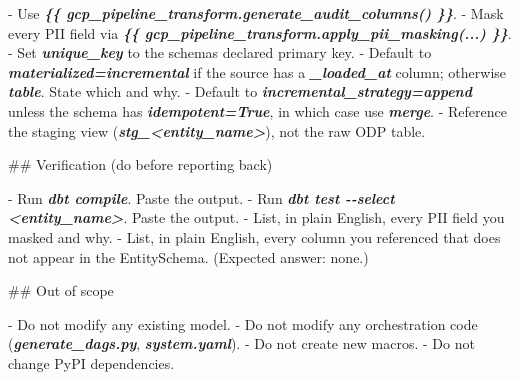 \documentclass[
  11pt,
  british,
  oneside]{book}
\newenvironment{Shaded}{\begin{snugshade}}{\end{snugshade}}
\newcommand{\FunctionTok}[1]{\textcolor[rgb]{0.00,0.00,0.00}{#1}}
\newcommand{\InformationTok}[1]{\textcolor[rgb]{0.56,0.35,0.01}{\textbf{\textit{#1}}}}
\newcommand{\NormalTok}[1]{#1}
\newcommand{\SpecialStringTok}[1]{\textcolor[rgb]{0.31,0.60,0.02}{#1}}
\begin{document}
\begin{Shaded}
\begin{Highlighting}[]
\SpecialStringTok{{-} }\NormalTok{Use }\InformationTok{\textasciigrave{}\{\{ gcp\_pipeline\_transform.generate\_audit\_columns() \}\}\textasciigrave{}}\NormalTok{.}
\SpecialStringTok{{-} }\NormalTok{Mask every PII field via}
  \InformationTok{\textasciigrave{}\{\{ gcp\_pipeline\_transform.apply\_pii\_masking(...) \}\}\textasciigrave{}}\NormalTok{.}
\SpecialStringTok{{-} }\NormalTok{Set }\InformationTok{\textasciigrave{}unique\_key\textasciigrave{}}\NormalTok{ to the schema\textquotesingle{}s declared primary key.}
\SpecialStringTok{{-} }\NormalTok{Default to }\InformationTok{\textasciigrave{}materialized=\textquotesingle{}incremental\textquotesingle{}\textasciigrave{}}\NormalTok{ if the source has a}
  \InformationTok{\textasciigrave{}\_loaded\_at\textasciigrave{}}\NormalTok{ column; otherwise }\InformationTok{\textasciigrave{}table\textasciigrave{}}\NormalTok{. State which and why.}
\SpecialStringTok{{-} }\NormalTok{Default to }\InformationTok{\textasciigrave{}incremental\_strategy=\textquotesingle{}append\textquotesingle{}\textasciigrave{}}\NormalTok{ unless the schema}
\NormalTok{  has }\InformationTok{\textasciigrave{}idempotent=True\textasciigrave{}}\NormalTok{, in which case use }\InformationTok{\textasciigrave{}merge\textasciigrave{}}\NormalTok{.}
\SpecialStringTok{{-} }\NormalTok{Reference the staging view (}\InformationTok{\textasciigrave{}stg\_\textless{}entity\_name\textgreater{}\textasciigrave{}}\NormalTok{), not the}
\NormalTok{  raw ODP table.}

\FunctionTok{\#\# Verification (do before reporting back)}

\SpecialStringTok{{-} }\NormalTok{Run }\InformationTok{\textasciigrave{}dbt compile\textasciigrave{}}\NormalTok{. Paste the output.}
\SpecialStringTok{{-} }\NormalTok{Run }\InformationTok{\textasciigrave{}dbt test {-}{-}select \textless{}entity\_name\textgreater{}\textasciigrave{}}\NormalTok{. Paste the output.}
\SpecialStringTok{{-} }\NormalTok{List, in plain English, every PII field you masked and why.}
\SpecialStringTok{{-} }\NormalTok{List, in plain English, every column you referenced that}
\NormalTok{  does not appear in the EntitySchema. (Expected answer: none.)}

\FunctionTok{\#\# Out of scope}

\SpecialStringTok{{-} }\NormalTok{Do not modify any existing model.}
\SpecialStringTok{{-} }\NormalTok{Do not modify any orchestration code (}\InformationTok{\textasciigrave{}generate\_dags.py\textasciigrave{}}\NormalTok{,}
  \InformationTok{\textasciigrave{}system.yaml\textasciigrave{}}\NormalTok{).}
\SpecialStringTok{{-} }\NormalTok{Do not create new macros.}
\SpecialStringTok{{-} }\NormalTok{Do not change PyPI dependencies.}
\end{Highlighting}
\end{Shaded}
\end{document}
